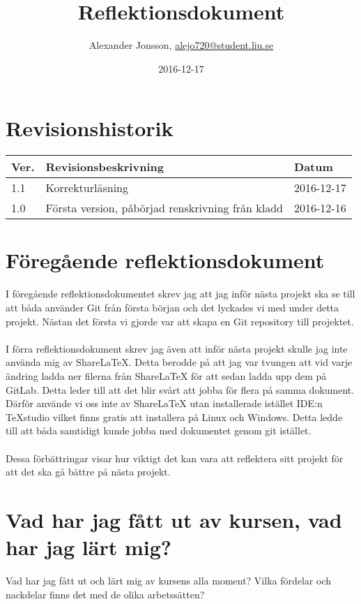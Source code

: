 \documentclass{TDP003mall}
\author{Alexander Jonsson, \url{alejo720@student.liu.se}}
\title{Reflektionsdokument}
\date{2016-12-17}
\begin{document}
	\projectpage
	\section{Revisionshistorik}
	\begin{table}[!h]
		\begin{tabularx}{\linewidth}{|l|X|l|}
			\hline
			Ver. & Revisionsbeskrivning & Datum \\\hline
			1.1 & Korrekturläsning & 2016-12-17 \\\hline
			1.0 & Första version, påbörjad renskrivning från kladd & 2016-12-16 \\\hline
		\end{tabularx}
	\end{table}
	
	\newpage
	
	\section{Föregående reflektionsdokument}
	I föregående reflektionsdokumentet skrev jag att jag inför nästa projekt ska se till att båda använder Git från första början och det lyckades vi med under detta projekt. Nästan det första vi gjorde var att skapa en Git repository till projektet.
	\\ \\
	I förra reflektionsdokument skrev jag även att inför nästa projekt skulle jag inte använda mig av ShareLaTeX. Detta berodde på att jag var tvungen att vid varje ändring ladda ner filerna från ShareLaTeX för att sedan ladda upp dem på GitLab. Detta leder till att det blir svårt att jobba för flera på samma dokument. Därför använde vi oss inte av ShareLaTeX utan installerade istället IDE:n TeXstudio vilket finns gratis att installera på Linux och Windows. Detta ledde till att båda samtidigt kunde jobba med dokumentet genom git istället.
	\\ \\
	Dessa förbättringar visar hur viktigt det kan vara att reflektera sitt projekt för att det ska gå bättre på nästa projekt.
	
	\section{Vad har jag fått ut av kursen, vad har jag lärt mig?}
	Vad har jag fått ut och lärt mig av kursens alla moment? Vilka fördelar och nackdelar finns det med de olika arbetssätten?
\end{document}
